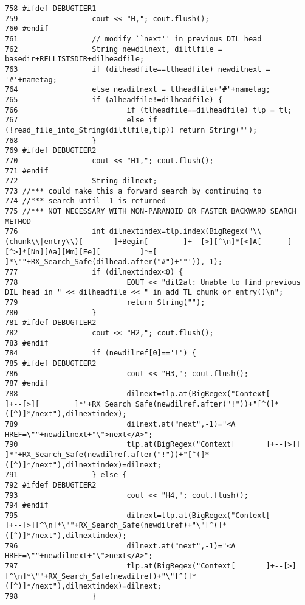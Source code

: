 \begin{verbatim}
758 #ifdef DEBUGTIER1
759                 cout << "H,"; cout.flush();
760 #endif
761                 // modify ``next'' in previous DIL head
762                 String newdilnext, diltlfile = basedir+RELLISTSDIR+dilheadfile;
763                 if (dilheadfile==tlheadfile) newdilnext = '#'+nametag;
764                 else newdilnext = tlheadfile+'#'+nametag;
765                 if (alheadfile!=dilheadfile) {
766                         if (tlheadfile==dilheadfile) tlp = tl;
767                         else if (!read_file_into_String(diltlfile,tlp)) return String("");
768                 }
769 #ifdef DEBUGTIER2
770                 cout << "H1,"; cout.flush();
771 #endif
772                 String dilnext;
773 //*** could make this a forward search by continuing to
774 //*** search until -1 is returned
775 //*** NOT NECESSARY WITH NON-PARANOID OR FASTER BACKWARD SEARCH METHOD
776                 int dilnextindex=tlp.index(BigRegex("\\(chunk\\|entry\\)[       ]+Begin[        ]+--[>][^\n]*[<]A[      ][^>]*[Nn][Aa][Mm][Ee][         ]*=[    ]*\""+RX_Search_Safe(dilhead.after("#")+'"')),-1);
777                 if (dilnextindex<0) {
778                         EOUT << "dil2al: Unable to find previous DIL head in " << dilheadfile << " in add_TL_chunk_or_entry()\n";
779                         return String("");
780                 }
781 #ifdef DEBUGTIER2
782                 cout << "H2,"; cout.flush();
783 #endif
784                 if (newdilref[0]=='!') {
785 #ifdef DEBUGTIER2
786                         cout << "H3,"; cout.flush();
787 #endif
788                         dilnext=tlp.at(BigRegex("Context[       ]+--[>][        ]*"+RX_Search_Safe(newdilref.after("!"))+"[^(]*([^)]*/next"),dilnextindex);
789                         dilnext.at("next",-1)="<A HREF=\""+newdilnext+"\">next</A>";
790                         tlp.at(BigRegex("Context[       ]+--[>][        ]*"+RX_Search_Safe(newdilref.after("!"))+"[^(]*([^)]*/next"),dilnextindex)=dilnext;
791                 } else {
792 #ifdef DEBUGTIER2
793                         cout << "H4,"; cout.flush();
794 #endif
795                         dilnext=tlp.at(BigRegex("Context[       ]+--[>][^\n]*\""+RX_Search_Safe(newdilref)+"\"[^(]*([^)]*/next"),dilnextindex);
796                         dilnext.at("next",-1)="<A HREF=\""+newdilnext+"\">next</A>";
797                         tlp.at(BigRegex("Context[       ]+--[>][^\n]*\""+RX_Search_Safe(newdilref)+"\"[^(]*([^)]*/next"),dilnextindex)=dilnext;
798                 }

\end{verbatim}
